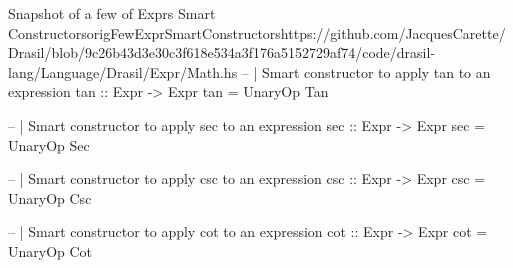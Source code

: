 \begin{haskell}{Snapshot of a few of Exprs Smart Constructors}{origFewExprSmartConstructors}{https://github.com/JacquesCarette/Drasil/blob/9c26b43d3e30c3f618e534a3f176a5152729af74/code/drasil-lang/Language/Drasil/Expr/Math.hs}
-- | Smart constructor to apply tan to an expression
tan :: Expr -> Expr
tan = UnaryOp Tan

-- | Smart constructor to apply sec to an expression
sec :: Expr -> Expr 
sec = UnaryOp Sec

-- | Smart constructor to apply csc to an expression
csc :: Expr -> Expr
csc = UnaryOp Csc

-- | Smart constructor to apply cot to an expression
cot :: Expr -> Expr 
cot = UnaryOp Cot
\end{haskell}
